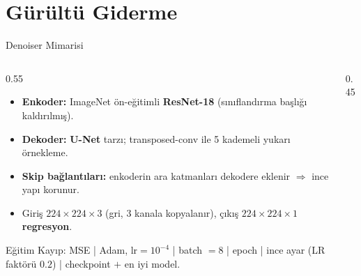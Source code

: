 \documentclass[aspectratio=169]{beamer}
\begin{document}
\section{Gürültü Giderme}
\begin{frame}{Denoiser Mimarisi}
  \begin{columns}[T]
    \begin{column}{0.55\textwidth}
      \begin{itemize}\small
        \item \textbf{Enkoder:} ImageNet ön-eğitimli \textbf{ResNet-18}
              (sınıflandırma başlığı kaldırılmış).
        \item \textbf{Dekoder:} \textbf{U-Net} tarzı; transposed-conv ile 5 kademeli
              yukarı örnekleme.
        \item \textbf{Skip bağlantıları:} enkoderin ara katmanları dekodere
              eklenir $\Rightarrow$ ince yapı korunur.
        \item Giriş $224\times224\times3$ (gri, 3 kanala kopyalanır),
              çıkış $224\times224\times1$ \textbf{regresyon}.
      \end{itemize}
      \begin{block}{Eğitim}\scriptsize
        Kayıp: MSE \;|\; Adam, $\text{lr}=10^{-4}$ \;|\; batch $=8$ \;| epoch \;|\; ince ayar (LR faktörü $0.2$) \;|\; checkpoint $+$ en iyi model.
      \end{block}
    \end{column}
    \begin{column}{0.45\textwidth}
      \centering
    \end{column}
  \end{columns}
\end{frame}
\end{document}
